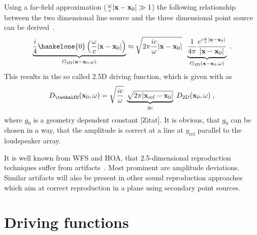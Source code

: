 \documentclass{article}
\begin{document}
Using a far-field approximation ($\frac{\omega}{c}|  \mathbf{x} - \mathbf{x} _0 | \gg 1$) the following
relationship between the two dimensional line source and the three dimensional
point source can be derived~\cite{Williams1999}.
\begin{equation}
    \underbrace{
        \frac{i}{4} \hankelone{0}\left(\omegac |\xx|\right)
    }_{G_\twoD(\xx,\omega)}
    \approx 
    \sqrt{2\pi \frac{ic}{\omega} |\xx|}\;\;
    \underbrace{
        \frac{1}{4 \pi} \frac{e^{i\omegac|\xx|}}{|\xx|}
    }_{G_\threeD(\xx,\omega)} \qp
\label{eq:2D_Green_approx}
\end{equation}
This results in the so called 2.5D driving function, which is given with
 as
\begin{equation}
    D_\twohalfD(\x_0,\omega) = \\ 
        \sqrt{ \frac{ic}{\omega} } \;
        \underbrace{\sqrt{2\pi|\x_\text{ref}-\x_0|}}_{g_0} \;
        D_\twoD(\x_0,\omega) \qc 
\label{eq:D_25D}
\end{equation}
where $g_0$ is a geometry dependent constant [Zitat]. It is obvious, that
$g_0$ can be chosen in a way, that the amplitude is correct at a line at
$y_\text{ref}$ parallel to the loudspeaker array.

It is well known from
WFS and HOA, that 2.5-dimensional reproduction techniques suffer
from artifacts~\cite{Verheijen:PhD,Ahrens08:Acta}. Most prominent
are amplitude deviations. Similar artifacts will also be present in other sound reproduction
approaches which aim at correct reproduction in a plane using secondary point
sources.


\section{Driving functions}
\label{sec:drivingfunctions}
\end{document}
